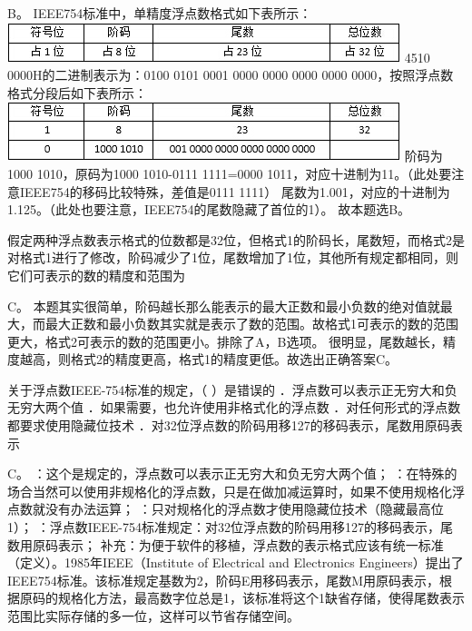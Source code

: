 \par\fourch{}{\textcolor{red}{}}{}{}
\begin{solution}B。 IEEE754标准中，单精度浮点数格式如下表所示：
\includegraphics[width=4.51042in,height=0.45833in]{computerassets/aa2982267974c6fb0d16d1ef6ea7562a.jpeg}
4510 0000H的二进制表示为：0100 0101 0001 0000 0000 0000 0000
0000，按照浮点数格式分段后如下表所示：
\includegraphics[width=4.51042in,height=0.67708in]{computerassets/42d8d4afe3909b90ccc7f0d4d3b29578.jpeg}
阶码为1000 1010，原码为1000 1010-0111 1111=0000
1011，对应十进制为11。（此处要注意IEEE754的移码比较特殊，差值是0111
1111）
尾数为1.001，对应的十进制为1.125。（此处也要注意，IEEE754的尾数隐藏了首位的1）。
故本题选B。
\end{solution}
\question 假定两种浮点数表示格式的位数都是32位，但格式1的阶码长，尾数短，而格式2是对格式1进行了修改，阶码减少了1位，尾数增加了1位，其他所有规定都相同，则它们可表示的数的精度和范围为
\par{}
\begin{solution}C。
本题其实很简单，阶码越长那么能表示的最大正数和最小负数的绝对值就最大，而最大正数和最小负数其实就是表示了数的范围。故格式1可表示的数的范围更大，格式2可表示的数的范围更小。排除了A，B选项。
很明显，尾数越长，精度越高，则格式2的精度更高，格式1的精度更低。故选出正确答案C。
\end{solution}
\question 关于浮点数IEEE-754标准的规定，（ ）是错误的
．浮点数可以表示正无穷大和负无穷大两个值
．如果需要，也允许使用非格式化的浮点数
．对任何形式的浮点数都要求使用隐藏位技术
．对32位浮点数的阶码用移127的移码表示，尾数用原码表示
\par{}
\begin{solution}C。 ：这个是规定的，浮点数可以表示正无穷大和负无穷大两个值；
：在特殊的场合当然可以使用非规格化的浮点数，只是在做加减运算时，如果不使用规格化浮点数就没有办法运算；
：只对规格化的浮点数才使用隐藏位技术（隐藏最高位1）；
：浮点数IEEE-754标准规定：对32位浮点数的阶码用移127的移码表示，尾数用原码表示；
补充：为便于软件的移植，浮点数的表示格式应该有统一标准（定义）。1985年IEEE（Institute
of Electrical and Electronics
Engineers）提出了IEEE754标准。该标准规定基数为2，阶码E用移码表示，尾数M用原码表示，根据原码的规格化方法，最高数字位总是1，该标准将这个1缺省存储，使得尾数表示范围比实际存储的多一位，这样可以节省存储空间。
\end{solution}
